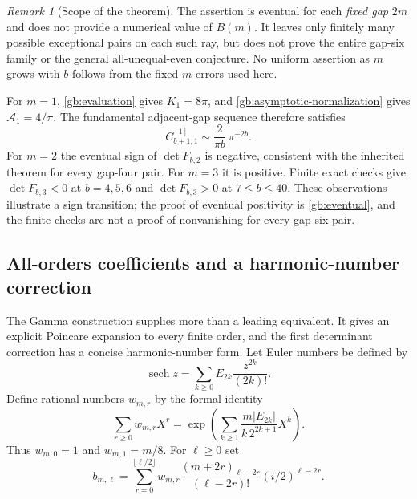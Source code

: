 \documentclass[11pt,a4paper]{article}
\numberwithin{equation}{section}
\theoremstyle{definition}
\theoremstyle{remark}
\newtheorem{remark}[theorem]{Remark}
\begin{document}
\begin{remark}[Scope of the theorem]\label{gb:scope}
The assertion is eventual for each \emph{fixed gap} $2m$ and
does not provide a numerical value of $B(m)$.  It leaves only
finitely many possible exceptional pairs on each such ray, but
does not prove the entire gap-six family or the general
all-unequal-even conjecture.  No uniform assertion as $m$ grows
with $b$ follows from the fixed-$m$ errors used here.
\end{remark}

For $m=1$, \eqref{gb:evaluation} gives $K_1=8\pi$, and
\eqref{gb:asymptotic-normalization} gives $\mathcal A_1=4/\pi$.
The fundamental adjacent-gap sequence therefore satisfies
\[
        C^{[1]}_{b+1,1}\sim\frac{2}{\pi b}\,\pi^{-2b}.
\]
For $m=2$ the eventual sign of $\det F_{b,2}$ is negative,
consistent with the inherited theorem for every gap-four pair.
For $m=3$ it is positive.  Finite exact checks give
$\det F_{b,3}<0$ at $b=4,5,6$ and $\det F_{b,3}>0$ at
$7\le b\le40$.  These observations illustrate a sign transition;
the proof of eventual positivity is \cref{gb:eventual}, and the
finite checks are not a proof of nonvanishing for every gap-six pair.

\subsection{All-orders coefficients and a harmonic-number correction}

The Gamma construction supplies more than a leading equivalent.
It gives an explicit Poincare expansion to every finite order,
and the first determinant correction has a concise harmonic-number
form.  Let Euler numbers be defined by
\[
                \operatorname{sech}z=
                \sum_{k\ge0}E_{2k}\frac{z^{2k}}{(2k)!}.
\]
Define rational numbers $w_{m,r}$ by the formal identity
\begin{equation}\label{gb:w-series}
 \sum_{r\ge0}w_{m,r}X^r
   =\exp\!\left(\sum_{k\ge1}
            \frac{m|E_{2k}|}{k\,2^{2k+1}}X^k\right).
\end{equation}
Thus $w_{m,0}=1$ and $w_{m,1}=m/8$.
For $\ell\ge0$ set
\begin{equation}\label{gb:b-coefficients}
 b_{m,\ell}=\sum_{r=0}^{\lfloor\ell/2\rfloor}
  w_{m,r}\frac{(m+2r)_{\ell-2r}}{(\ell-2r)!}
                     (i/2)^{\ell-2r}.
\end{equation}
\end{document}
